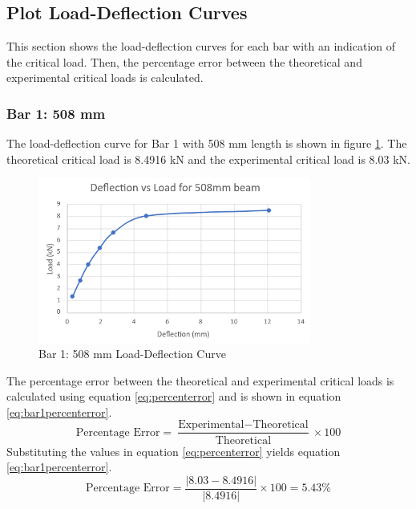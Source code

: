 \documentclass[12pt, titlepage]{article}
\begin{document}
\subsection{Plot Load-Deflection Curves}
This section shows the load-deflection curves for each bar with an indication
of the critical load. Then, the percentage error between the theoretical and
experimental critical loads is calculated.
\subsubsection{Bar 1: 508 mm}
The load-deflection curve for Bar 1 with 508 mm length is shown in figure
\ref{fig:bar1loaddefl}. The theoretical critical load is 8.4916 kN and the
experimental critical load is 8.03 kN.
\begin{figure}[H]
    \centering
    \includegraphics[width=0.8\textwidth]{./Images/d508.png}
    \caption{Bar 1: 508 mm Load-Deflection Curve}
    \label{fig:bar1loaddefl}
\end{figure}
The percentage error between the theoretical and experimental critical loads
is calculated using equation \ref{eq:percenterror} and is shown in equation
\ref{eq:bar1percenterror}.
\begin{equation}
    \label{eq:percenterror}
    \text{Percentage Error} = \frac{\text{Experimental} - \text{Theoretical}}{\text{Theoretical}} \times 100
\end{equation}
Substituting the values in equation \ref{eq:percenterror} yields equation
\ref{eq:bar1percenterror}.
\begin{equation}
    \label{eq:bar1percenterror}
    \text{Percentage Error} = \frac{\left| 8.03 - 8.4916\right|}{\left|8.4916\right|} \times 100 = 5.43\%
\end{equation}
\end{document}

